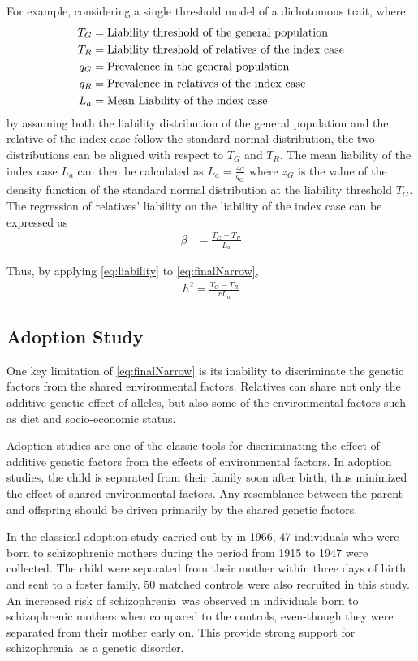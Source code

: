 \documentclass[12pt]{scrbook}
\newcommand*{\scz}{schizophrenia}
\begin{document}
For example, considering a single threshold model of a dichotomous trait, where 
\begin{align}
T_G &= \text{Liability threshold of the general population}\notag\\
T_R &= \text{Liability threshold of relatives of the index case} \notag\\
q_G &= \text{Prevalence in the general population}\notag\\
q_R &= \text{Prevalence in relatives of the index case}\notag\\
L_a &= \text{Mean Liability of the index case} \notag
\end{align}
by assuming both the liability distribution of the general population and the relative of the index case follow the standard normal distribution, the two distributions can be aligned with respect to $T_G$ and $T_R$. 
The mean liability of the index case $L_a$ can then be calculated as $L_a=\frac{z_G}{q_G}$ where $z_G$ is the value of the density function of the standard normal distribution at the liability threshold $T_G$.
The regression of relatives' liability on the liability of the index case can be expressed as
\begin{align}
\beta &= \frac{T_G-T_R}{L_a}
\label{eq:liability}
\end{align}

Thus, by applying \cref{eq:liability} to \cref{eq:finalNarrow},
\begin{align}
h^2 =\frac{T_G-T_R}{rL_a}
\end{align}

\subsection{Adoption Study}
One key limitation of \cref{eq:finalNarrow} is its inability to discriminate the genetic factors from the shared environmental factors.
Relatives can share not only the additive genetic effect of alleles, but also some of the environmental factors such as diet and socio-economic status. 

Adoption studies are one of the classic tools for discriminating the effect of additive genetic factors from the effects of environmental factors. 
In adoption studies, the child is separated from their family soon after birth, thus minimized the effect of shared environmental factors.
Any resemblance between the parent and offspring should be driven primarily by the shared genetic factors.

In the classical adoption study carried out by \citet{HESTON1966} in 1966, 47 individuals who were born to schizophrenic mothers during the period from 1915 to 1947 were collected. 
The child were separated from their mother within three days of birth and sent to a foster family. 
50 matched controls were also recruited in this study.
An increased risk of \scz\ was observed in individuals born to schizophrenic mothers when compared to the controls, even-though they were separated from their mother early on.
This provide strong support for \scz\ as a genetic disorder. 
\end{document}
